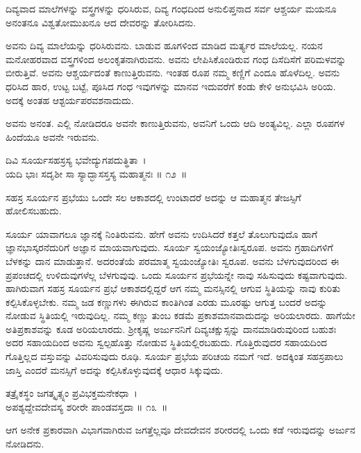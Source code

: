 \begin{artha}
ದಿವ್ಯವಾದ ಮಾಲೆಗಳನ್ನು ವಸ್ತ್ರಗಳನ್ನು ಧರಿಸಿರುವ, ದಿವ್ಯ ಗಂಧದಿಂದ ಅನುಲಿಪ್ತನಾದ ಸರ್ವ ಆಶ್ಚರ್ಯ ಮಯನೂ ಅನಂತನೂ ವಿಶ್ವತೋಮುಖನೂ ಆದ ದೇವರನ್ನು ತೋರಿಸಿದನು.
\end{artha}

ಅವನು ದಿವ್ಯ ಮಾಲೆಯನ್ನು ಧರಿಸಿರುವನು. ಬಾಡುವ ಹೂಗಳಿಂದ ಮಾಡಿದ ಮರ್ತ್ಯರ ಮಾಲೆಯಲ್ಲ. ನಯನ ಮನೋಹರವಾದ ವಸ್ತ್ರಗಳಿಂದ ಅಲಂಕೃತನಾಗಿರುವನು. ಅವನು ಲೇಪಿಸಿಕೊಂಡಿರುವ ಗಂಧ ದಿಸೆದಿಸೆಗೆ ಪರಿಮಳವನ್ನು ಬೀರುತ್ತಿವೆ. ಅವನು ಆಶ್ಚರ್ಯದಂತೆ ಕಾಣುತ್ತಿರುವನು. ಇಂತಹ ರೂಪ ನಮ್ಮ ಕಣ್ಣಿಗೆ ಎಂದೂ ಹೊಳೆದಿಲ್ಲ. ಅವನು ಧರಿಸಿದ ಹಾರ, ಉಟ್ಟ ಬಟ್ಟೆ, ಪೂಸಿದ ಗಂಧ ಇವುಗಳನ್ನು ಮಾನವ ಇದುವರೆಗೆ ಕಂಡು ಕೇಳಿ ಅನುಭವಿಸಿ ಅರಿಯ. ಅದಕ್ಕೆ ಅಂತಹ ಆಶ್ಟರ್ಯಪರವಶನಾದುದು.

ಅವನು ಅನಂತ. ಎಲ್ಲಿ ನೋಡಿದರೂ ಅವನೇ ಕಾಣುತ್ತಿರುವನು, ಅವನಿಗೆ ಒಂದು ಆದಿ ಅಂತ್ಯವಿಲ್ಲ. ಎಲ್ಲಾ ರೂಪಗಳ ಹಿಂದೆಯೂ ಅವನೇ ಇರುವನು.

\begin{shloka}
ದಿವಿ ಸೂರ್ಯಸಹಸ್ರಸ್ಯ ಭವೇದ್ಯುಗಪದುತ್ಥಿತಾ~।\\ಯದಿ ಭಾಃ ಸದೃಶೀ ಸಾ ಸ್ಯಾದ್ಭಾಸಸ್ತಸ್ಯ ಮಹಾತ್ಮನಃ \hfill॥ ೧೨~॥
\end{shloka}

\begin{artha}
ಸಹಸ್ರ ಸೂರ್ಯನ ಪ್ರಭೆಯು ಒಂದೇ ಸಲ ಆಕಾಶದಲ್ಲಿ ಉಂಟಾದರೆ ಅದನ್ನು ಆ ಮಹಾತ್ಮನ ತೇಜಸ್ಸಿಗೆ ಹೋಲಿಸಬಹುದು.
\end{artha}

ಸೂರ್ಯ ಯಾವಾಗಲೂ ಜ್ಞಾನಕ್ಕೆ ನಿಂತಿರುವನು. ಹೇಗೆ ಅವನು ಉದಿಸಿದರೆ ಕತ್ತಲೆ ತೊಲುಗುವುದೊ ಹಾಗೆ ಜ್ಞಾನಭಾಸ್ಕರನೆದುರಿಗೆ ಅಜ್ಞಾನ ಮಾಯವಾಗುವುದು. ಸೂರ್ಯ ಸ್ವಯಂಜ್ಯೋತಿಃಸ್ವರೂಪ. ಅವನು ಗ್ರಹಾದಿಗಳಿಗೆ ಬೆಳಕನ್ನು ದಾನ ಮಾಡುತ್ತಾನೆ. ಅದರಂತೆಯೆ ಪರಮಾತ್ಮ ಸ್ವಯಂಜ್ಯೋತಿಃ ಸ್ವರೂಪ. ಅವನು ಬೆಳಗುವುದರಿಂದ ಈ ಪ್ರಪಂಚದಲ್ಲಿ ಉಳಿದುವುಗಳೆಲ್ಲ ಬೆಳಗುವುವು. ಒಂದು ಸೂರ್ಯನ ಪ್ರಭೆಯನ್ನೇ ನಾವು ಸಹಿಸುವುದು ಕಷ್ಟವಾಗುವುದು. ಹಾಗಿರುವಾಗ ಸಹಸ್ರ ಸೂರ್ಯನ ಪ್ರಭೆ ಆಕಾಶದಲ್ಲಿದ್ದರೆ ಆಗ ನಮ್ಮ ಮನಸ್ಸಿನಲ್ಲಿ ಆಗುವ ಸ್ಥಿತಿಯನ್ನು ನಾವು ಕುರಿತು ಕಲ್ಪಿಸಿಕೊಳ್ಳಬೇಕು. ನಮ್ಮ ಜಡ ಕಣ್ಣುಗಳು ಈಗಿರುವ ಕಾಂತಿಗಿಂತ ಎರಡು ಮೂರಷ್ಟು ಆಗುತ್ತ ಬಂದರೆ ಅದನ್ನು ನೋಡುವ ಸ್ಥಿತಿಯಲ್ಲಿ ಇರುವುದಿಲ್ಲ. ನಮ್ಮ ಕಣ್ಣು ತುಂಬ ಕಡಮೆ ಪ್ರಕಾಶಮಾನವಾದುದನ್ನು ಅರಿಯಲಾರದು. ಹಾಗೆಯೇ ಅತಿಪ್ರಕಾಶವನ್ನು ಕೂಡ ಅರಿಯಲಾರದು. ಶ‍್ರೀಕೃಷ್ಣ ಅರ್ಜುನನಿಗೆ ದಿವ್ಯಚಕ್ಷುಸ್ಸನ್ನು ದಾನಮಾಡಿರುವುರಿಂದ ಬಹುಶಃ ಅದರ ಸಹಾಯದಿಂದ ಅವನು ಸ್ವಲ್ಪಹೊತ್ತು ನೋಡುವ ಸ್ಥಿತಿಯಲ್ಲಿರಬಹುದು. ಗೊತ್ತಿರುವುದರ ಸಹಾಯದಿಂದ ಗೊತ್ತಿಲ್ಲದ ವಸ್ತುವನ್ನು ವಿವರಿಸುವುದು ರೂಢಿ. ಸೂರ್ಯ ಪ್ರಭೆಯ ಪರಿಚಯ ನಮಗೆ ಇದೆ. ಅದಕ್ಕಿಂತ ಸಹಸ್ರಪಾಲು ಜಾಸ್ತಿ ಎಂದರೆ ಮನಸ್ಸಿಗೆ ಅದನ್ನು ಕಲ್ಪಿಸಿಕೊಳ್ಳುವುದಕ್ಕೆ ಆಧಾರ ಸಿಕ್ಕುವುದು.

\begin{shloka}
ತತ್ರೈಕಸ್ಥಂ ಜಗತ್ಕೃತ್ಸ್ನಂ ಪ್ರವಿಭಕ್ತಮನೇಕಧಾ~।\\ಅಪಶ್ಯದ್ದೇವದೇವಸ್ಯ ಶರೀರೇ ಪಾಂಡವಸ್ತದಾ \hfill॥ ೧೩~॥
\end{shloka}

\begin{artha}
ಆಗ ಅನೇಕ ಪ್ರಕಾರವಾಗಿ ವಿಭಾಗವಾಗಿರುವ ಜಗತ್ತೆಲ್ಲವೂ ದೇವದೇವನ ಶರೀರದಲ್ಲಿ ಒಂದು ಕಡೆ ಇರುವುದನ್ನು ಅರ್ಜುನ ನೋಡಿದನು.
\end{artha}

